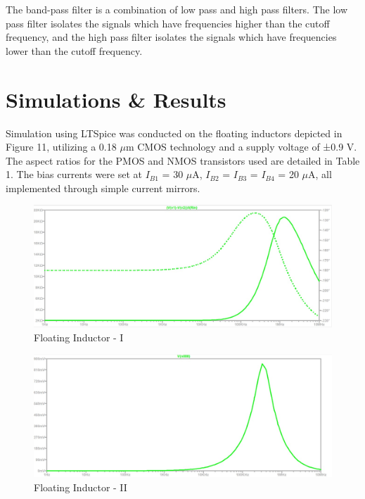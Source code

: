 \documentclass{./styles/svproc}
\begin{document}
The band-pass filter is a combination of low pass and high pass filters. The low pass filter isolates the signals which have frequencies higher than the cutoff frequency, and the high pass filter isolates the signals which have frequencies lower than the cutoff frequency.

\section{Simulations \& Results}

Simulation using LTSpice was conducted on the floating inductors depicted in Figure 11, utilizing a 0.18 $\mu$m CMOS technology and a supply voltage of ±0.9 V. The aspect ratios for the PMOS and NMOS transistors used are detailed in Table 1. The bias currents were set at $I_{B1}$ = 30 $\mu$A, $I_{B2}$ = $I_{B3}$ = $I_{B4}$ = 20 $\mu$A, all implemented through simple current mirrors.

\begin{figure}[h]
\begin{center}
    \includegraphics[width=1\textwidth]{WhatsApp Image 2023-11-20 at 15.28.38_cffe913f.jpg}
    \caption{Floating Inductor - I}
 \end{center}
\end{figure}


\begin{figure}[h]
\begin{center}    
    \includegraphics[width=1\textwidth]{rlc app sim2.jpg}
    \caption{Floating Inductor - II}
  \end{center}
\end{figure}
\end{document}
